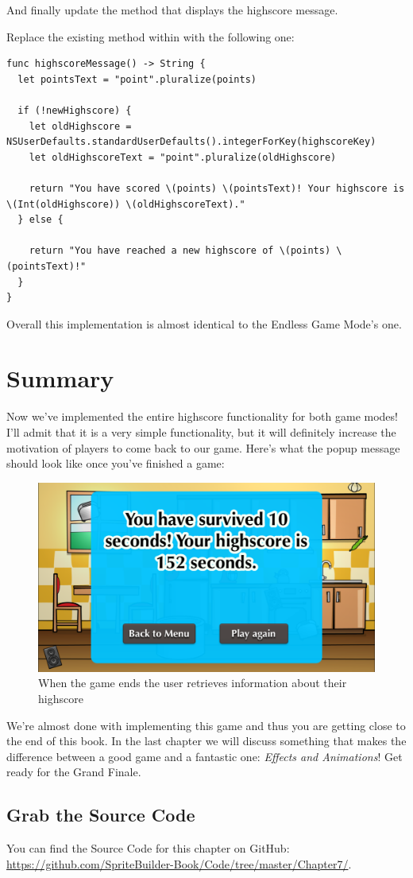 And finally update the method that displays the highscore message.
\begin{leftbar}
Replace the existing  method within
 with the following one:
\begin{lstlisting}
func highscoreMessage() -> String {
  let pointsText = "point".pluralize(points)
  
  if (!newHighscore) {
    let oldHighscore = NSUserDefaults.standardUserDefaults().integerForKey(highscoreKey)
    let oldHighscoreText = "point".pluralize(oldHighscore)
    
    return "You have scored \(points) \(pointsText)! Your highscore is \(Int(oldHighscore)) \(oldHighscoreText)."
  } else {
    
    return "You have reached a new highscore of \(points) \(pointsText)!"
  }
}
\end{lstlisting}
\end{leftbar}
Overall this implementation is almost identical to the Endless Game Mode's one.

\section{Summary}
Now we've implemented the entire highscore functionality for both game modes!
I'll admit that it is a very simple functionality, but it will definitely
increase the motivation of players to come back to our game. Here's what the
popup message should look like once you've finished a game:

\begin{figure}[H]
    \centering
    \includegraphics[width=0.6\linewidth]{images/Chapter8/Highscore_Message.png}
    \caption{When the game ends the user retrieves information about their
    highscore}
\end{figure}

We're almost done with implementing this game and thus you are getting close to
the end of this book. In the last chapter we will discuss something that makes
the difference between a good game and a fantastic one: \textit{Effects and
Animations}! Get ready for the Grand Finale.

\subsection{Grab the Source Code}
You can find the Source Code for this chapter on GitHub:
\url{https://github.com/SpriteBuilder-Book/Code/tree/master/Chapter7/}.
